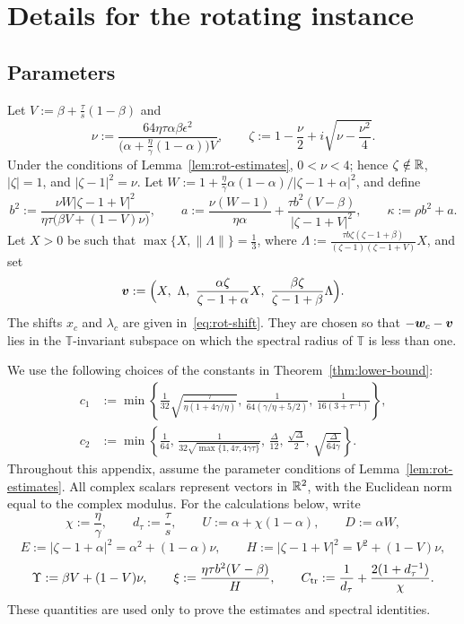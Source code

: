\section{Details for the rotating instance}
\label{app:lb-rotation}

\subsection{Parameters}
\label{app:lb-rotation-params}
Let \(V:=\beta+\frac{\tau}{s}(1-\beta)\) and
\begin{equation}
\nu:=\frac{64\eta\tau\alpha\beta\epsilon^2}
  {\bigl(\alpha+\frac{\eta}{\gamma}(1-\alpha)\bigr)V},
\qquad
\zeta:=1-\frac{\nu}{2}+i\sqrt{\nu-\frac{\nu^2}{4}} .
\label{eq:rot-basic}
\end{equation}
Under the conditions of Lemma~\ref{lem:rot-estimates}, \(0<\nu<4\); hence
\(\zeta\notin\mathbb{R}\), \(|\zeta|=1\), and \(|\zeta-1|^2=\nu\). Let
\(W:=1+\frac{\eta}{\gamma}\alpha(1-\alpha)/|\zeta-1+\alpha|^2\), and define
\begin{equation}
b^2:=\frac{\nu W|\zeta-1+V|^2}{\eta\tau\bigl(\beta V+(1-V)\nu\bigr)},
\qquad
a:=\frac{\nu(W-1)}{\eta\alpha}+\frac{\tau b^2(V-\beta)}{|\zeta-1+V|^2},
\qquad
\kappa:=\rho b^2+a.
\label{eq:rot-b-a}
\end{equation}
Let \(X>0\) be such that \(\max\{X,\|\Lambda\|\}=\frac13\), where
\(\Lambda:=\frac{\tau b\zeta(\zeta-1+\beta)}{(\zeta-1)(\zeta-1+V)}X\), and set
\begin{equation}
\bv:=\Bigl(X,\ \Lambda,\ \frac{\alpha\zeta}{\zeta-1+\alpha}X,\
  \frac{\beta\zeta}{\zeta-1+\beta}\Lambda\Bigr).
\label{eq:rot-eigvec}
\end{equation}
The shifts \(x_c\) and \(\lambda_c\) are given in~\eqref{eq:rot-shift}. They
are chosen so that \(-\bm{w}_c-\bm{v}\) lies in the \(\mathbb T\)-invariant subspace
on which the spectral radius of \(\mathbb T\) is less than one.


We use the following choices of the constants in Theorem~\ref{thm:lower-bound}:
\begin{equation}
\label{eq:rot-thresholds}
\begin{aligned}
c_1&:=\min\left\{
\frac1{32}\sqrt{\frac{\tau}{\eta(1+4\gamma/\eta)}},\,
\frac1{64(\gamma/\eta+5/2)},\,
\frac1{16(3+\tau^{-1})}\right\},\\
c_2&:=\min\left\{\frac1{64},\,
\frac1{32\sqrt{\max\{1,4\tau,4\gamma\tau\}}},\,
\frac\Delta{12},\,\frac{\sqrt\Delta}{2},\,
\sqrt{\frac\Delta{64\gamma}}\right\}.
\end{aligned}
\end{equation}
Throughout this appendix, assume the parameter conditions of
Lemma~\ref{lem:rot-estimates}. All complex scalars represent vectors in
\(\mathbb{R}^2\), with the Euclidean norm equal to the complex modulus.
For the calculations below, write
\[
\chi:=\frac\eta\gamma,\qquad d_\tau:=\frac\tau s,\qquad
U:=\alpha+\chi(1-\alpha),\qquad D:=\alpha W,
\]
\[
E:=|\zeta-1+\alpha|^2=\alpha^2+(1-\alpha)\nu,\qquad
H:=|\zeta-1+V|^2=V^2+(1-V)\nu,
\]
\[
\Upsilon:=\beta V+(1-V)\nu,\qquad
\xi:=\frac{\eta\tau b^2(V-\beta)}H,\qquad
C_{\rm tr}:=\frac1{d_\tau}+\frac{2(1+d_\tau^{-1})}{\chi}.
\]
These quantities are used only to prove the estimates and spectral identities.

